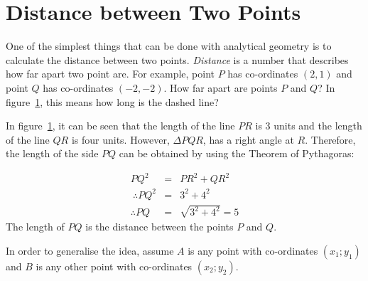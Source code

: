             \section{ Distance between Two Points}
            \nopagebreak
            \label{m39107*id66786}One of the simplest things that can be done with analytical geometry is to calculate the distance between two points. \textsl{Distance} is a number that describes how far apart two point are. For example, point $P$ has co-ordinates $(2,1)$ and point $Q$ has co-ordinates $(-2,-2)$. How far apart are points $P$ and $Q$? In figure~\ref{fig:trianglePQR}, this means how long is the dashed line?\par 
    \setcounter{subfigure}{0}
 	\begin{figure}[H] %
    \begin{center}
    \end{center}
\label{fig:trianglePQR}
 \end{figure}        
        \label{m39107*id66883}In figure~\ref{fig:trianglePQR}, it can be seen that the length of the line $PR$ is 3 units and the length of the line $QR$ is four units. However, $\Delta PQR$, has a right angle at $R$. Therefore, the length of the side $PQ$ can be obtained by using the Theorem of Pythagoras:\par 
        \label{m39107*id66950}\nopagebreak\noindent{}          
    \begin{eqnarray*}
     P{Q}^{2} & = & P{R}^{2}+Q{R}^{2} \\ \
\therefore P{Q}^{2} & = & {3}^{2}+{4}^{2} \\ 
\therefore PQ & = & \sqrt{{3}^{2}+{4}^{2}}=5  
      \end{eqnarray*}
        \label{m39107*id67090}The length of $PQ$ is the distance between the points $P$ and $Q$.\par 
        \label{m39107*id67126}In order to generalise the idea, assume $A$ is any point with co-ordinates $({x}_{1};{y}_{1})$ and $B$ is any other point with co-ordinates $({x}_{2};{y}_{2})$.\par 
